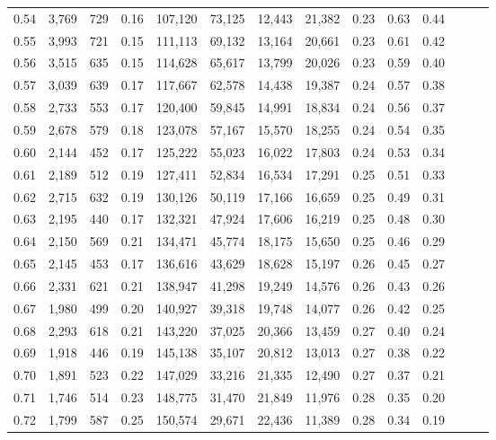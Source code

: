 \begin{tabular}{rrrrrrrrrrrrrr}
0.54 &  3,769 &  729 &  0.16 &  107,120 &   73,125 &  12,443 &  21,382 &  0.23 &  0.63 &      0.44 \\
0.55 &  3,993 &  721 &  0.15 &  111,113 &   69,132 &  13,164 &  20,661 &  0.23 &  0.61 &      0.42 \\
0.56 &  3,515 &  635 &  0.15 &  114,628 &   65,617 &  13,799 &  20,026 &  0.23 &  0.59 &      0.40 \\
0.57 &  3,039 &  639 &  0.17 &  117,667 &   62,578 &  14,438 &  19,387 &  0.24 &  0.57 &      0.38 \\
0.58 &  2,733 &  553 &  0.17 &  120,400 &   59,845 &  14,991 &  18,834 &  0.24 &  0.56 &      0.37 \\
0.59 &  2,678 &  579 &  0.18 &  123,078 &   57,167 &  15,570 &  18,255 &  0.24 &  0.54 &      0.35 \\
0.60 &  2,144 &  452 &  0.17 &  125,222 &   55,023 &  16,022 &  17,803 &  0.24 &  0.53 &      0.34 \\
0.61 &  2,189 &  512 &  0.19 &  127,411 &   52,834 &  16,534 &  17,291 &  0.25 &  0.51 &      0.33 \\
0.62 &  2,715 &  632 &  0.19 &  130,126 &   50,119 &  17,166 &  16,659 &  0.25 &  0.49 &      0.31 \\
0.63 &  2,195 &  440 &  0.17 &  132,321 &   47,924 &  17,606 &  16,219 &  0.25 &  0.48 &      0.30 \\
0.64 &  2,150 &  569 &  0.21 &  134,471 &   45,774 &  18,175 &  15,650 &  0.25 &  0.46 &      0.29 \\
0.65 &  2,145 &  453 &  0.17 &  136,616 &   43,629 &  18,628 &  15,197 &  0.26 &  0.45 &      0.27 \\
0.66 &  2,331 &  621 &  0.21 &  138,947 &   41,298 &  19,249 &  14,576 &  0.26 &  0.43 &      0.26 \\
0.67 &  1,980 &  499 &  0.20 &  140,927 &   39,318 &  19,748 &  14,077 &  0.26 &  0.42 &      0.25 \\
0.68 &  2,293 &  618 &  0.21 &  143,220 &   37,025 &  20,366 &  13,459 &  0.27 &  0.40 &      0.24 \\
0.69 &  1,918 &  446 &  0.19 &  145,138 &   35,107 &  20,812 &  13,013 &  0.27 &  0.38 &      0.22 \\
0.70 &  1,891 &  523 &  0.22 &  147,029 &   33,216 &  21,335 &  12,490 &  0.27 &  0.37 &      0.21 \\
0.71 &  1,746 &  514 &  0.23 &  148,775 &   31,470 &  21,849 &  11,976 &  0.28 &  0.35 &      0.20 \\
0.72 &  1,799 &  587 &  0.25 &  150,574 &   29,671 &  22,436 &  11,389 &  0.28 &  0.34 &      0.19 \\

\end{tabular}
